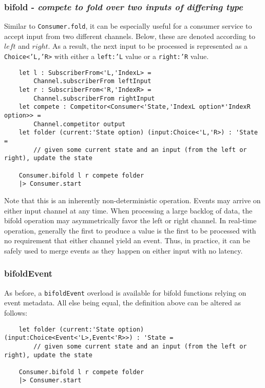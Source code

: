 \documentclass{article}
\begin{document}
\subsubsection{bifold - \textit{compete to fold over two inputs of differing type}}

Similar to \texttt{Consumer.fold}, it can be especially useful for a consumer service to accept input from two different channels.  Below, these are denoted according to $left$ and $right$. As a result, the next input to be processed is represented as a \texttt{Choice<'L,'R>} with either a \texttt{left:'L} value or a \texttt{right:'R} value.

\begin{verbatim}
    let l : SubscriberFrom<'L,'IndexL> =
        Channel.subscriberFrom leftInput
    let r : SubscriberFrom<'R,'IndexR> =
        Channel.subscriberFrom rightInput
    let compete : Competitor<Consumer<'State,'IndexL option*'IndexR option>> =
        Channel.competitor output
    let folder (current:'State option) (input:Choice<'L,'R>) : 'State =
        // given some current state and an input (from the left or right), update the state

    Consumer.bifold l r compete folder
    |> Consumer.start
\end{verbatim}

Note that this is an inherently non-deterministic operation.  Events may arrive on either input channel at any time.  When processing a large backlog of data, the bifold operation may asymmetrically favor the left or right channel.  In real-time operation, generally the first to produce a value is the first to be processed with no requirement that either channel yield an event.  Thus, in practice, it can be safely used to merge events as they happen on either input with no latency.

\subsubsection{bifoldEvent}

As before, a \texttt{bifoldEvent} overload is available for bifold functions relying on event metadata.  All else being equal, the definition above can be altered as follows:

\begin{verbatim}
    let folder (current:'State option) (input:Choice<Event<'L>,Event<'R>>) : 'State =
        // given some current state and an input (from the left or right), update the state

    Consumer.bifold l r compete folder
    |> Consumer.start
\end{verbatim}
\end{document}
